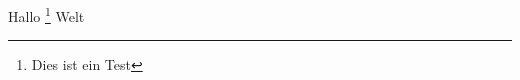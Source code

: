 \documentclass{scrartcl}
\begin{document}
Hallo\tagmcend
\footnote{Dies ist ein Test}
Welt\tagmcend
\tagstructend
\tagstructend
\end{document}
